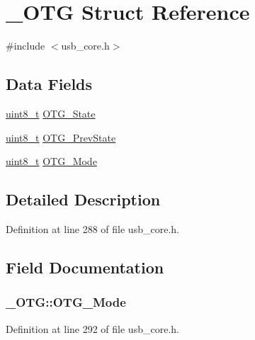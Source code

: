 \hypertarget{struct___o_t_g}{\section{\-\_\-\-O\-T\-G Struct Reference}
\label{struct___o_t_g}
}


{\ttfamily \#include $<$usb\-\_\-core.\-h$>$}

\subsection*{Data Fields}
\begin{DoxyCompactItemize}
\item 
\hyperlink{stdint_8h_aba7bc1797add20fe3efdf37ced1182c5}{uint8\-\_\-t} \hyperlink{struct___o_t_g_ab2788b9a0ee109b43e4f8fcba8490293}{O\-T\-G\-\_\-\-State}
\item 
\hyperlink{stdint_8h_aba7bc1797add20fe3efdf37ced1182c5}{uint8\-\_\-t} \hyperlink{struct___o_t_g_a1be74b830692077a86f632d852a9d1d2}{O\-T\-G\-\_\-\-Prev\-State}
\item 
\hyperlink{stdint_8h_aba7bc1797add20fe3efdf37ced1182c5}{uint8\-\_\-t} \hyperlink{struct___o_t_g_a740b713417c5111e38ef7b53af0bc47a}{O\-T\-G\-\_\-\-Mode}
\end{DoxyCompactItemize}


\subsection{Detailed Description}


Definition at line 288 of file usb\-\_\-core.\-h.



\subsection{Field Documentation}
\hypertarget{struct___o_t_g_a740b713417c5111e38ef7b53af0bc47a}{
\subsubsection[{O\-T\-G\-\_\-\-Mode}]{ \-\_\-\-O\-T\-G\-::\-O\-T\-G\-\_\-\-Mode}}\label{struct___o_t_g_a740b713417c5111e38ef7b53af0bc47a}


Definition at line 292 of file usb\-\_\-core.\-h.

